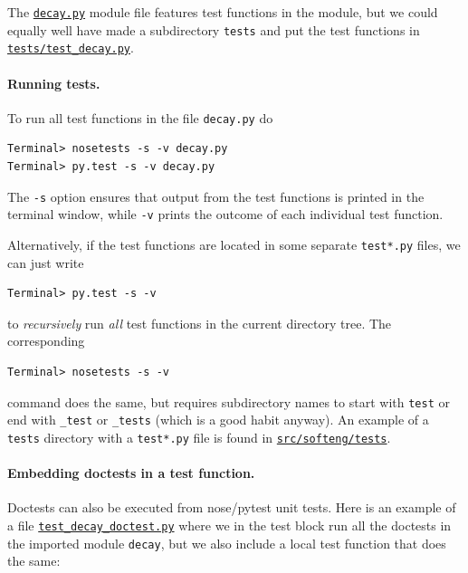 \documentclass[%
oneside,                 %
final,                   %
10pt]{article}
\begin{document}
The \href{{http://tinyurl.com/ofkw6kc/softeng/decay.py}}{\nolinkurl{decay.py}} module file features
test functions in the module, but we could equally well have made
a subdirectory \texttt{tests} and put the test functions in
\href{{http://tinyurl.com/ofkw6kc/softeng/tests/test_decay.py}}{\nolinkurl{tests/test_decay.py}}.

\paragraph{Running tests.}
To run all test functions in the file \texttt{decay.py} do

\begin{Verbatim}[frame=lines,label=\fbox{{\tiny Terminal}},framesep=2.5mm,framerule=0.7pt,fontsize=\fontsize{9pt}{9pt}]
Terminal> nosetests -s -v decay.py
Terminal> py.test -s -v decay.py
\end{Verbatim}
The \texttt{-s} option ensures that output from the test functions is printed
in the terminal window, while \texttt{-v} prints the outcome of each individual
test function.

Alternatively, if the test functions are located in some separate
\texttt{test*.py} files,
we can just write

\begin{Verbatim}[frame=lines,label=\fbox{{\tiny Terminal}},framesep=2.5mm,framerule=0.7pt,fontsize=\fontsize{9pt}{9pt}]
Terminal> py.test -s -v
\end{Verbatim}
to \emph{recursively} run \emph{all} test functions in the current
directory tree. The corresponding

\begin{Verbatim}[frame=lines,label=\fbox{{\tiny Terminal}},framesep=2.5mm,framerule=0.7pt,fontsize=\fontsize{9pt}{9pt}]
Terminal> nosetests -s -v
\end{Verbatim}
command does the same, but requires subdirectory names to start
with \texttt{test} or end with \Verb!_test! or \Verb!_tests! (which is a good habit anyway).
An example of a \texttt{tests} directory with a \texttt{test*.py}
file is found in \href{{http://tinyurl.com/ofkw6kc/softeng/tests}}{\nolinkurl{src/softeng/tests}}.


\paragraph{Embedding doctests in a test function.}
Doctests can also be executed from nose/pytest unit tests. Here is an
example of a file \href{{http://tinyurl.com/ofkw6kc/softeng/tests/test_decay_doctest.py}}{\nolinkurl{test_decay_doctest.py}} where we in the test
block run all the doctests in the imported module \texttt{decay}, but we also
include a local test function that does the same:
\end{document}
